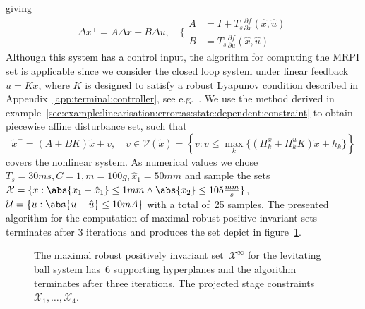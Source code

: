 giving
%
\[
\Delta x^+ = A \Delta x + B \Delta u , \quad
\Biggl\{\begin{aligned} A &= I+T_s\frac{\partial f}{\partial  x}(\hat
  x,\hat u) \\
B &= T_s \frac{\partial f}{\partial u}(\hat x,\hat u)
\end{aligned}
\]
%
Although this system has a control input, the algorithm for computing the MRPI set is applicable since we consider 
the closed loop system under linear feedback  $u=Kx$, where $K$ is designed to satisfy a robust Lyapunov condition 
described in Appendix~\ref{app:terminal:controller}, see e.g.~\cite{Boyd:94}.
%
We use the method derived in example~\ref{sec:example:linearisation:error:as:state:dependent:constraint} to 
obtain piecewise affine disturbance set, such that
%
\begin{equation}
	\tilde x^+ = (A+ BK)\tilde x + v,\quad v\in\mathcal V(\tilde x) = \left\{v:v\leq\max_{k} 
	\{(H_k^x + H_k^u K) \tilde x+ h_k\}
	\right\}
\end{equation}
%
covers the nonlinear system.
%
As numerical values we chose $T_s=30ms, C=1, m=100g, \hat x_1 = 50mm$ and sample
the sets $\mathcal X=\{x:\abs{x_1- \hat x_1}\leq 1mm\wedge \abs{x_2}\leq 105\frac{mm}{s}\}$, 
$\mathcal U=\{u:\abs{ u-\hat u}\leq10mA\}$ with a total of~25 samples.
%
The presented algorithm for the computation of maximal robust positive invariant sets 
terminates after 3 iterations and produces the set depict in figure~\ref{fig:MRPI:set:levitating:ball}.
%
\begin{figure}
\centering
{}
\caption[Example MRPI set]{The maximal robust positively invariant set~$\mathcal X^\infty$ for the levitating ball system
has~6 supporting hyperplanes and the algorithm terminates after three iterations. The projected stage 
constraints~$\mathcal X_1,\dots,\mathcal X_4$.}
\label{fig:MRPI:set:levitating:ball}
\end{figure}

